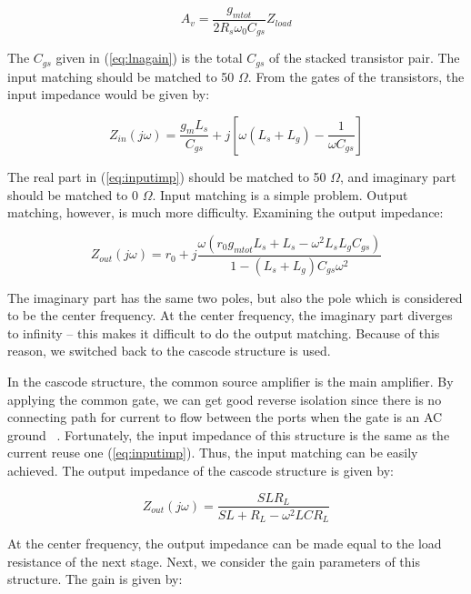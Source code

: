 \begin{equation} 
  	A_{v} = \frac{g_{mtot}}{2R_s \omega_0 C_{gs}}Z_{load}
	\label{eq:lnagain}
\end{equation}

The $C_{gs}$ given in (\ref{eq:lnagain}) is the total $C_{gs}$ of the stacked transistor pair.  The input matching should be matched to 50 $\Omega$. From the gates of the transistors, the input impedance would be given by:

\begin{equation} 
  	Z_{in}(j\omega)=\frac{g_mL_s}{C_{gs}} + j[\omega (L_s+L_g) - \frac{1}{\omega C_{gs}}]
	\label{eq:inputimp}
\end{equation}

The real part in (\ref{eq:inputimp}) should be matched to 50 $\Omega$, and imaginary part should be matched to 0 $\Omega$. Input matching is a simple problem. Output matching, however, is much more difficulty. Examining the output impedance:

\begin{equation} 
  	Z_{out}(j\omega) = r_0 + j\frac{\omega(r_0g_{mtot}L_s+L_s-\omega^2L_sL_gC_{gs})}{1-(L_s+L_g)C_{gs}\omega^2}
\end{equation}

The imaginary part has the same two poles, but also the pole which is considered to be the center frequency. At the center frequency, the imaginary part diverges to infinity -- this makes it difficult to do the output matching. Because of this reason, we switched back to the cascode structure is used.

In the cascode structure, the common source amplifier is the main amplifier. By applying the common gate, we can get good reverse isolation since there is no connecting path for current to flow between the ports when the gate is an AC ground ~\cite{Razavi}. Fortunately, the input impedance of this structure is the same as the current reuse one (\ref{eq:inputimp}). Thus, the input matching can be easily achieved. The output impedance of the cascode structure is given by:

\begin{equation} 
  	Z_{out}(j\omega) = \frac{SLR_L}{SL+R_L-\omega^2LCR_L}
\end{equation}

At the center frequency, the output impedance can be made equal to  the load resistance of the next stage. Next, we consider the gain parameters of this structure. The gain is given by:

